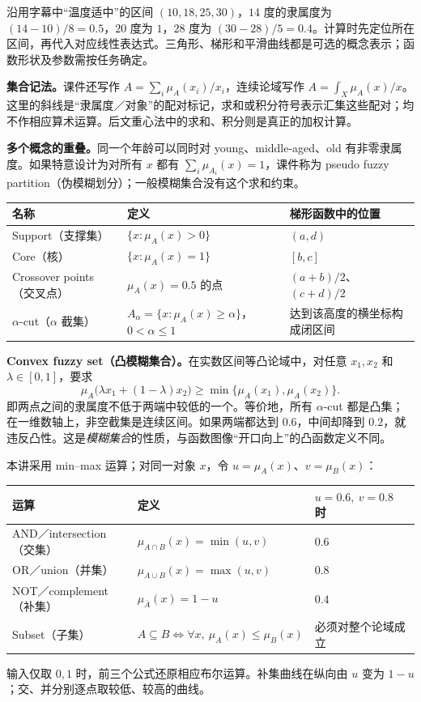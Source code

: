 沿用字幕中“温度适中”的区间 $(10,18,25,30)$，$14$ 度的隶属度为 $(14-10)/8=0.5$，$20$ 度为 $1$，$28$ 度为 $(30-28)/5=0.4$。计算时先定位所在区间，再代入对应线性表达式。三角形、梯形和平滑曲线都是可选的概念表示；函数形状及参数需按任务确定。

\textbf{集合记法。}课件还写作 $A=\sum_i\mu_A(x_i)/x_i$，连续论域写作 $A=\int_X\mu_A(x)/x$。这里的斜线是“隶属度／对象”的配对标记，求和或积分符号表示汇集这些配对；均不作相应算术运算。后文重心法中的求和、积分则是真正的加权计算。


\textbf{多个概念的重叠。}同一个年龄可以同时对 young、middle-aged、old 有非零隶属度。如果特意设计为对所有 $x$ 都有 $\sum_i\mu_{A_i}(x)=1$，课件称为 pseudo fuzzy partition（伪模糊划分）；一般模糊集合没有这个求和约束。

\begin{center}
\small
\begin{tabularx}{\textwidth}{@{}lXX@{}}
\toprule
名称 & 定义 & 梯形函数中的位置 \\
\midrule
Support（支撑集） & $\{x:\mu_A(x)>0\}$ & $(a,d)$ \\
Core（核） & $\{x:\mu_A(x)=1\}$ & $[b,c]$ \\
Crossover points（交叉点） & $\mu_A(x)=0.5$ 的点 & $(a+b)/2$、$(c+d)/2$ \\
$\alpha$-cut（$\alpha$ 截集） & $A_\alpha=\{x:\mu_A(x)\ge\alpha\}$，$0<\alpha\le1$ & 达到该高度的横坐标构成闭区间 \\
\bottomrule
\end{tabularx}
\end{center}

\textbf{Convex fuzzy set（凸模糊集合）。}在实数区间等凸论域中，对任意 $x_1,x_2$ 和 $\lambda\in[0,1]$，要求
\[
 \mu_A\bigl(\lambda x_1+(1-\lambda)x_2\bigr)
 \ge\min\{\mu_A(x_1),\mu_A(x_2)\}.
\]
即两点之间的隶属度不低于两端中较低的一个。等价地，所有 $\alpha$-cut 都是凸集；在一维数轴上，非空截集是连续区间。如果两端都达到 $0.6$，中间却降到 $0.2$，就违反凸性。这是\emph{模糊集合}的性质，与函数图像“开口向上”的凸函数定义不同。


本讲采用 min--max 运算；对同一对象 $x$，令 $u=\mu_A(x)$、$v=\mu_B(x)$：
\begin{center}
\small
\begin{tabularx}{\textwidth}{@{}lXX@{}}
\toprule
运算 & 定义 & $u=0.6,\ v=0.8$ 时 \\
\midrule
AND／intersection（交集） & $\mu_{A\cap B}(x)=\min(u,v)$ & $0.6$ \\
OR／union（并集） & $\mu_{A\cup B}(x)=\max(u,v)$ & $0.8$ \\
NOT／complement（补集） & $\mu_{\bar A}(x)=1-u$ & $0.4$ \\
Subset（子集） & $A\subseteq B\iff\forall x,\ \mu_A(x)\le\mu_B(x)$ & 必须对整个论域成立 \\
\bottomrule
\end{tabularx}
\end{center}
输入仅取 $0,1$ 时，前三个公式还原相应布尔运算。补集曲线在纵向由 $u$ 变为 $1-u$；交、并分别逐点取较低、较高的曲线。


